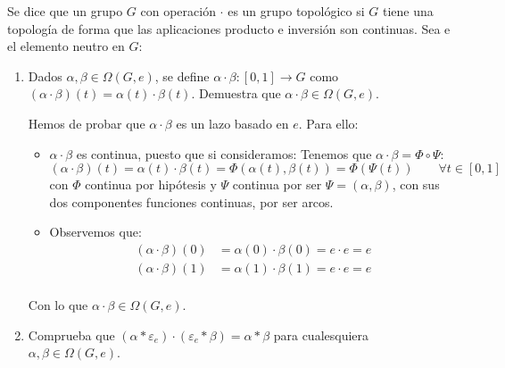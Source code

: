 \begin{ejercicio}
    Se dice que un grupo $G$ con operación $\cdot $ es un grupo topológico si $G$ tiene una topología de forma que las aplicaciones producto e inversión
     
    son continuas. Sea e el elemento neutro en $G$:
    \begin{enumerate}[label=\alph*)]
        \item Dados $\alpha,\beta\in \Omega(G,e)$, se define $\alpha\cdot \beta:[0,1]\to G$ como $(\alpha\cdot \beta)(t) = \alpha(t)\cdot \beta(t)$. Demuestra que $\alpha\cdot \beta\in \Omega(G,e)$.

            Hemos de probar que $\alpha\cdot \beta$ es un lazo basado en $e$. Para ello:
            \begin{itemize}
                \item $\alpha\cdot \beta$ es continua, puesto que si consideramos:
                    Tenemos que $\alpha\cdot \beta = \Phi \circ \Psi$:
                    \begin{equation*}
                        (\alpha\cdot \beta)(t) = \alpha(t)\cdot \beta(t) = \Phi(\alpha(t),\beta(t)) = \Phi(\Psi(t)) \qquad \forall t\in [0,1]
                    \end{equation*}
                    con $\Phi$ continua por hipótesis y $\Psi$ continua por ser $\Psi=(\alpha,\beta)$, con sus dos componentes funciones continuas, por ser arcos.
                \item Observemos que:
                    \begin{align*}
                        (\alpha\cdot \beta)(0) &= \alpha(0) \cdot \beta(0) = e\cdot e = e \\
                        (\alpha\cdot \beta)(1) &= \alpha(1) \cdot \beta(1) = e\cdot e = e \\
                    \end{align*}
            \end{itemize}
            Con lo que $\alpha\cdot \beta\in \Omega(G,e)$.
        \item Comprueba que $(\alpha\ast \varepsilon_e)\cdot (\varepsilon_e\ast \beta)=\alpha\ast \beta$ para cualesquiera $\alpha,\beta\in \Omega(G,e)$.


\end{enumerate}
\end{ejercicio}
